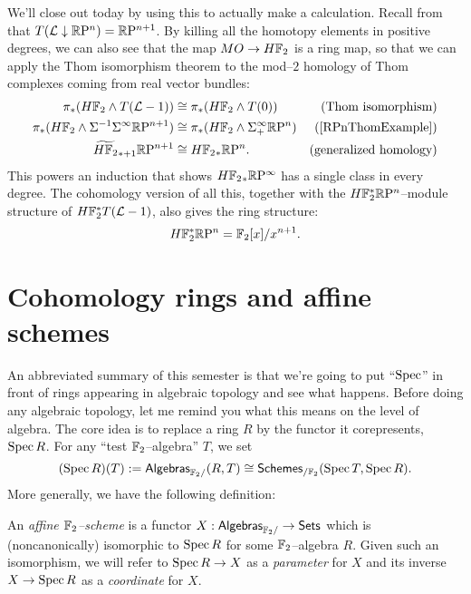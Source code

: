 \begin{example}\label{HF2RPinftyExample}
We'll close out today by using this to actually make a calculation. Recall from  that $T(\mathcal{L} \downarrow \mathbb R\mathrm P^n) = \mathbb R\mathrm P^{n+1}$.  By killing all the homotopy elements in positive degrees, we can also see that the map $MO \to H\mathbb F_2$ is a ring map, so that we can apply the Thom isomorphism theorem to the mod--$2$ homology of Thom complexes coming from real vector bundles:
\begin{align*}
\pi_* (H\F_2 \sm T(\L - 1)) & \cong \pi_* (H\F_2 \sm T(0)) & \text{(Thom isomorphism)} \\
\pi_* (H\F_2 \sm \Susp^{-1} \Susp^\infty \RP^{n+1}) & \cong \pi_* (H\F_2 \sm \Susp^\infty_+ \RP^n) & \text{(\Cref{RPnThomExample})} \\
\widetilde{H\F_2}_{*+1} \RP^{n+1} & \cong H\F_2{}_* \RP^n. & \text{(generalized homology)}
\end{align*}
This powers an induction that shows $H\mathbb F_2{}_* \mathbb R\mathrm P^\infty$ has a single class in every degree.    The cohomology version of all this, together with the $H\mathbb F_2^* \mathbb R\mathrm P^n$--module structure of $H\mathbb F_2^* T(\mathcal{L}-1)$, also gives the ring structure: \[H\mathbb F_2^* \mathbb R\mathrm P^n = \mathbb F_2[x] / x^{n+1}.\] 
\end{example}






\section{Cohomology rings and affine schemes}

An abbreviated summary of this semester is that we're going to put ``$\operatorname{Spec}$'' in front of rings appearing in algebraic topology and see what happens.  Before doing any algebraic topology, let me remind you what this means on the level of algebra.  The core idea is to replace a ring $R$ by the functor it corepresents, $\operatorname{Spec} R$.  For any ``test $\mathbb F_2$--algebra'' $T$, we set \[(\operatorname{Spec} R)(T) := \mathsf{Algebras}_{\mathbb F_2/}(R, T) \cong \mathsf{Schemes}_{/\mathbb F_2}(\operatorname{Spec} T, \operatorname{Spec} R).\]  More generally, we have the following definition:
\begin{definition}
An \textit{affine $\mathbb F_2$--scheme} is a functor $X: \mathsf{Algebras}_{\mathbb F_2/} \to \mathsf{Sets}$ which is (noncanonically) isomorphic to $\operatorname{Spec} R$ for some $\mathbb F_2$--algebra $R$.  Given such an isomorphism, we will refer to $\operatorname{Spec} R \to X$ as a \textit{parameter} for $X$ and its inverse $X \to \operatorname{Spec} R$ as a \textit{coordinate} for $X$.
\end{definition}

